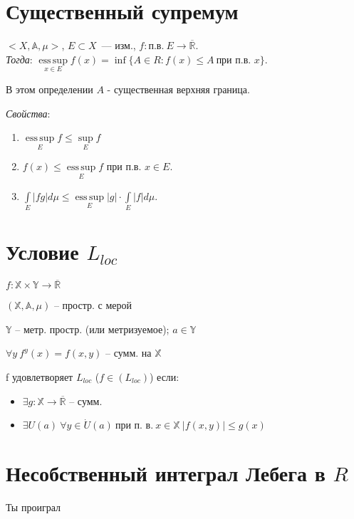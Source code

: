 \documentclass[paper=a4, fontsize=14pt]{report}
\DeclareMathOperator*{\esssup}{ess\, sup}
\begin{document}
\section{Существенный супремум}
$<X, \mathds{A}, \mu>$, $E \subset X$~--- изм., $f : \text{п.в.}\ E \rightarrow \overline{\mathbb{R}}$.\\

\emph{Тогда}: $\esssup\limits_{x \in E} f(x) = \inf \{A \in R : f(x) \leq A\ \text{при п.в. $x$}\}$.

В этом определении $A$ - существенная верхняя граница.

\emph{Свойства}:
\begin{enumerate}
    \item
    $\esssup\limits_E f \leq \sup\limits_E f$

    \item
    $f(x) \leq \esssup\limits_E f$ при п.в. $x \in E$.

    \item
    $\int\limits_E |fg|d\mu \leq \esssup\limits_E |g| \cdot \int\limits_E |f|d\mu$.
\end{enumerate}

\section{Условие $ L_{loc} $}

$ f : \mathbb{X} \times \mathbb{Y} \rightarrow \overline{\mathbb{R}}$

$ (\mathbb{X}, \mathbb{A}, \mu) $ -- простр. с мерой

$ \mathbb{Y} $ -- метр. простр. (или метризуемое); $ a \in \mathbb{Y} $


$ \forall y ~ f^y(x) = f(x, y) $ -- сумм. на $ \mathbb{X} $

f удовлетворяет $ L_{loc} $ ($ f \in (L_{loc}) $) если:
\begin{itemize}
	\item  $ \exists g : \mathbb{X} \rightarrow \overline{\mathbb{R}} $ -- сумм.
	\item $ \exists U(a) ~ \forall y \in \dot{U} (a) ~ \text{при п. в.} ~ x \in \mathbb{X} ~ |f(x, y)| \leq g(x)$
\end{itemize}

\section{Несобственный интеграл Лебега в $ R $}

Ты проиграл
\end{document}
